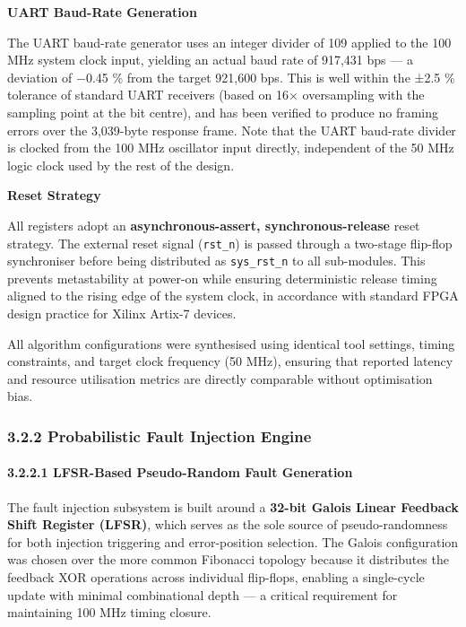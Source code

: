 \textbf{UART Baud-Rate Generation}

The UART baud-rate generator uses an integer divider of 109 applied to
the 100 MHz system clock input, yielding an actual baud rate of 917,431
bps --- a deviation of −0.45 \% from the target 921,600 bps. This is
well within the ±2.5 \% tolerance of standard UART receivers (based on
16× oversampling with the sampling point at the bit centre), and has
been verified to produce no framing errors over the 3,039-byte response
frame. Note that the UART baud-rate divider is clocked from the 100 MHz
oscillator input directly, independent of the 50 MHz logic clock used by
the rest of the design.

\textbf{Reset Strategy}

All registers adopt an \textbf{asynchronous-assert, synchronous-release}
reset strategy. The external reset signal (\texttt{rst\_n}) is passed
through a two-stage flip-flop synchroniser before being distributed as
\texttt{sys\_rst\_n} to all sub-modules. This prevents metastability at
power-on while ensuring deterministic release timing aligned to the
rising edge of the system clock, in accordance with standard FPGA design
practice for Xilinx Artix-7 devices.

All algorithm configurations were synthesised using identical tool
settings, timing constraints, and target clock frequency (50 MHz),
ensuring that reported latency and resource utilisation metrics are
directly comparable without optimisation bias.

\subsubsection{3.2.2 Probabilistic Fault Injection
Engine}\label{probabilistic-fault-injection-engine}

\paragraph{3.2.2.1 LFSR-Based Pseudo-Random Fault
Generation}\label{lfsr-based-pseudo-random-fault-generation}

The fault injection subsystem is built around a \textbf{32-bit Galois
Linear Feedback Shift Register (LFSR)}, which serves as the sole source
of pseudo-randomness for both injection triggering and error-position
selection. The Galois configuration was chosen over the more common
Fibonacci topology because it distributes the feedback XOR operations
across individual flip-flops, enabling a single-cycle update with
minimal combinational depth --- a critical requirement for maintaining
100 MHz timing closure.

